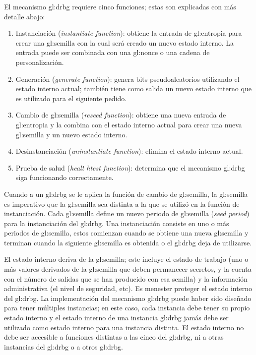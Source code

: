 El mecanismo \gls{gl:drbg} requiere cinco funciones; estas son explicadas con
más detalle abajo:
\begin{enumerate}
    \item Instanciación (\textit{instantiate function}): obtiene la entrada de
        \gls{gl:entropia} para crear una \gls{gl:semilla} con la cual será
        creado un nuevo estado interno. La entrada puede ser combinada con
        una \gls{gl:nonce} o una cadena de personalización.
    \item Generación (\textit{generate function}): genera bits pseudoaleatorios
        utilizando el estado interno actual; también tiene como salida un nuevo
        estado interno que es utilizado para el siguiente pedido.
    \item Cambio de \gls{gl:semilla} (\textit{reseed function}): obtiene una
        nueva entrada de \gls{gl:entropia} y la combina con el estado interno
        actual para crear una nueva \gls{gl:semilla} y un nuevo estado interno.
    \item Desinstanciación (\textit{uninstantiate function}): elimina el estado
        interno actual.
    \item Prueba de salud (\textit{healt htest function}): determina que el
        mecanismo \gls{gl:drbg} siga funcionando correctamente.
\end{enumerate}

Cuando a un \gls{gl:drbg} se le aplica la función de cambio de \gls{gl:semilla},
la \gls{gl:semilla} es imperativo que la \gls{gl:semilla} sea distinta a la que
se utilizó en la función de instanciación. Cada \gls{gl:semilla} define un nuevo
periodo de \gls{gl:semilla} (\textit{seed period}) para la instanciación del
\gls{gl:drbg}. Una instanciación consiste en uno o más periodos de
\gls{gl:semilla}, estos comienzan cuando se obtiene una nueva \gls{gl:semilla} y
terminan cuando la siguiente \gls{gl:semilla} es obtenida o el \gls{gl:drbg}
deja de utilizarse.

El estado interno deriva de la \gls{gl:semilla}; este incluye el estado de
trabajo (uno o más valores derivados de la \gls{gl:semilla} que deben
permanecer secretos, y la cuenta con el número de salidas que se han producido
con esa semilla) y la información administrativa (el nivel de seguridad, etc).
Es menester proteger el estado interno del \gls{gl:drbg}. La implementación del
mecanismo \gls{gl:drbg} puede haber sido diseñado para tener múltiples
instancias; en este caso, cada instancia debe tener su propio estado interno y
el estado interno de una instancia \gls{gl:drbg} jamás debe ser utilizado como
estado interno para una instancia distinta. El estado interno no debe ser
accesible a funciones distintas a las cinco del \gls{gl:drbg}, ni a otras
instancias del \gls{gl:drbg} o a otros \gls{gl:drbg}.

